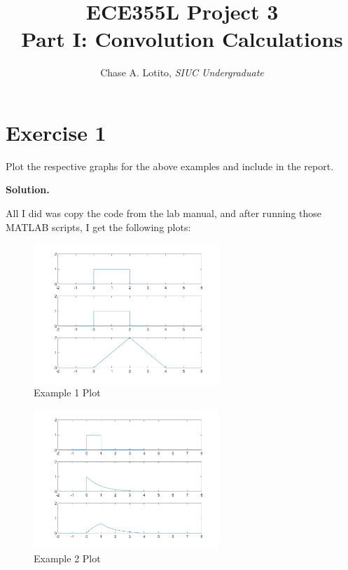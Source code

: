 \documentclass{article}
\title{\vspace{-3cm}ECE355L Project 3 \\ Part I: Convolution Calculations}
\author{Chase A. Lotito, \textit{SIUC Undergraduate}}
\date{}
\begin{document}
\pagestyle{fancy}

\fancyhead{}

\maketitle %

\section*{Exercise 1}

Plot the respective graphs for the above examples and include in the report.

\smallskip

\textbf{Solution.}

\smallskip

All I did was copy the code from the lab manual, and after running those MATLAB scripts, I get the following plots:

\begin{figure}[!ht] 
    \centering
    \includegraphics[width = 7cm]{plot1.png}
    \caption{Example 1 Plot}
    \label{fig:firstplot}
\end{figure}

\begin{figure}[!ht] 
    \centering
    \includegraphics[width = 7cm]{plot2.png}
    \caption{Example 2 Plot}
    \label{fig:secondplot}
\end{figure}
\end{document}
